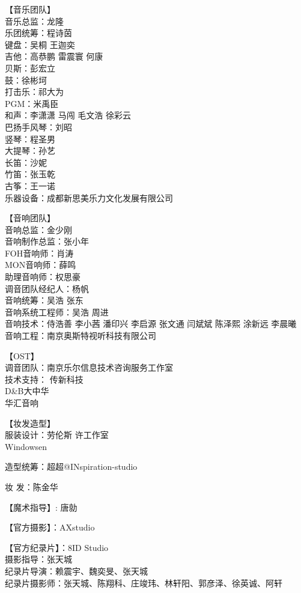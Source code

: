 \documentclass[]{ctexbook}
\begin{document}
【音乐团队】\\
音乐总监：龙隆\\
乐团统筹：程诗茵\\
键盘：吴桐 王迦奕\\
吉他：高恭鹏 雷震寰 何康\\
贝斯：彭宏立\\
鼓：徐彬坷\\
打击乐：祁大为\\
PGM：米禹臣\\
和声：李潇潇 马闯 毛文浩 徐彩云\\
巴扬手风琴：刘昭\\
竖琴：程圣男\\
大提琴：孙艺\\
长笛：沙妮\\
竹笛：张玉乾\\
古筝：王一诺\\
乐器设备：成都新思美乐力文化发展有限公司

【音响团队】\\
音响总监：金少刚\\
音响制作总监：张小年\\
FOH音响师：肖涛\\
MON音响师：薛鸣\\
助理音响师：权思豪\\
调音团队经纪人：杨帆\\
音响统筹：吴浩 张东\\
音响系统工程师：吴浩 周进\\
音响技术：侍浩善 李小茜 潘印兴 李启源 张文通 闫斌斌 陈泽熙 涂新远 李晨曦\\
音响工程：南京奥斯特视听科技有限公司

【OST】\\
调音团队：南京乐尔信息技术咨询服务工作室\\
技术支持： 传新科技\\
D\&B大中华\\
华汇音响

【妆发造型】\\
服装设计：劳伦斯 许工作室\\
Windowsen

造型统筹：超超@INspiration-studio

妆 发：陈金华

【魔术指导】: 唐勍

【官方摄影】：AXstudio

【官方纪录片】：8ID Studio\\
摄影指导：张天城\\
纪录片导演：赖震宇、魏奕旻、张天城\\
纪录片摄影师：张天城、陈翔科、庄竣玮、林轩阳、郭彦泽、徐英诚、阿轩
\end{document}
